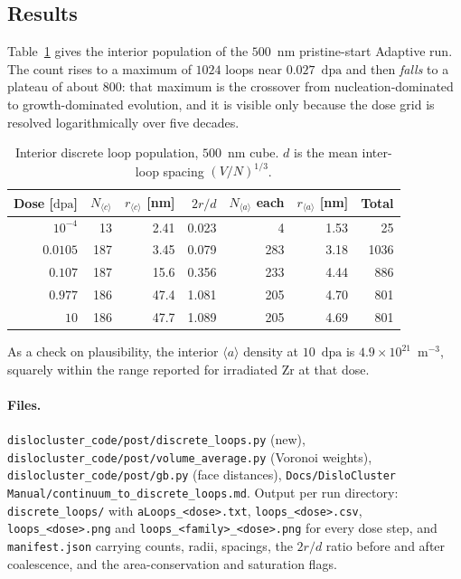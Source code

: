 \documentclass[11pt,a4paper]{article}
\newcommand{\code}[1]{\texttt{\small #1}}
\newcommand{\dpa}{\ensuremath{\mathrm{dpa}}}
\newcommand{\aloop}{\ensuremath{\langle a\rangle}}
\newcommand{\cloop}{\ensuremath{\langle c\rangle}}
\begin{document}
\subsection{Results}

Table~\ref{tab:loopresults} gives the interior population of the $500$~nm
pristine-start Adaptive run. The count rises to a maximum of $1024$ loops near
$0.027$~\dpa{} and then \emph{falls} to a plateau of about $800$: that maximum is
the crossover from nucleation-dominated to growth-dominated evolution, and it is
visible only because the dose grid is resolved logarithmically over five decades.

\begin{table}[htb]
\centering
\caption{Interior discrete loop population, $500$~nm cube. $d$ is the mean
inter-loop spacing $(V/N)^{1/3}$.}
\label{tab:loopresults}
\small
\begin{tabular}{rrrrrrr}
\toprule
Dose [\dpa] & $N_{\cloop}$ & $r_{\cloop}$ [nm] & $2r/d$ &
$N_{\aloop}$ each & $r_{\aloop}$ [nm] & Total \\
\midrule
$10^{-4}$ & 13  & 2.41  & 0.023 & 4   & 1.53 & 25 \\
$0.0105$  & 187 & 3.45  & 0.079 & 283 & 3.18 & 1036 \\
$0.107$   & 187 & 15.6  & 0.356 & 233 & 4.44 & 886 \\
$0.977$   & 186 & 47.4  & 1.081 & 205 & 4.70 & 801 \\
$10$      & 186 & 47.7  & 1.089 & 205 & 4.69 & 801 \\
\bottomrule
\end{tabular}
\end{table}

As a check on plausibility, the interior \aloop{} density at $10$~\dpa{} is
$4.9\times10^{21}$~m$^{-3}$, squarely within the range reported for irradiated
Zr at that dose.

\paragraph{Files.}
\code{dislocluster\_code/post/discrete\_loops.py} (new),
\code{dislocluster\_code/post/volume\_average.py} (Voronoi weights),
\code{dislocluster\_code/post/gb.py} (face distances),
\code{Docs/DisloCluster Manual/continuum\_to\_discrete\_loops.md}.
Output per run directory: \code{discrete\_loops/} with
\code{aLoops\_<dose>.txt}, \code{loops\_<dose>.csv},
\code{loops\_<dose>.png} and \code{loops\_<family>\_<dose>.png} for every dose
step, and \code{manifest.json} carrying counts, radii, spacings, the $2r/d$
ratio before and after coalescence, and the area-conservation and saturation
flags.
\end{document}

